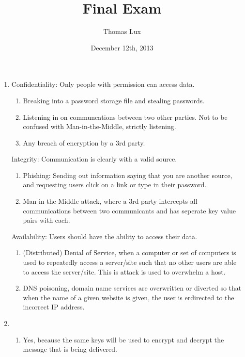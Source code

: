 \documentclass[a4paper, 11pt]{article}
\title{Final Exam}
\author{Thomas Lux}
\date{December 12th, 2013}
\begin{document}
\maketitle %

\singlespacing %


\begin{enumerate}

\item
  Confidentiality: Only people with permission can access data.
  \begin{enumerate}
  \item
    Breaking into a password storage file and stealing passwords.
  \item
    Listening in on communcations between two other parties.  Not to
    be confused with Man-in-the-Middle, strictly listening.
  \item
    Any breach of encryption by a 3rd party.
  \end{enumerate}
  
  Integrity: Communication is clearly with a valid source.
  \begin{enumerate}
  \item
    Phishing: Sending out information saying that you are another
    source, and requesting users click on a link or type in their
    password.
  \item
    Man-in-the-Middle attack, where a 3rd party intercepts all
    communications between two communicants and has seperate key value
    pairs with each.
  \end{enumerate}

  Availability: Users should have the ability to access their data.
  \begin{enumerate}
  \item
    (Distributed) Denial of Service, when a computer or set of
    computers is used to repeatedly access a server/site such that no
    other users are able to access the server/site.  This is attack is
    used to overwhelm a host.
  \item
    DNS poisoning, domain name services are overwritten or diverted so
    that when the name of a given website is given, the user is
    erdirected to the incorrect IP address. 
  \end{enumerate}

\item
  \begin{enumerate}
  \item
    Yes, because the same keys will be used to encrypt and decrypt the
    message that is being delivered.


\end{enumerate}
\end{enumerate}
\end{document}
